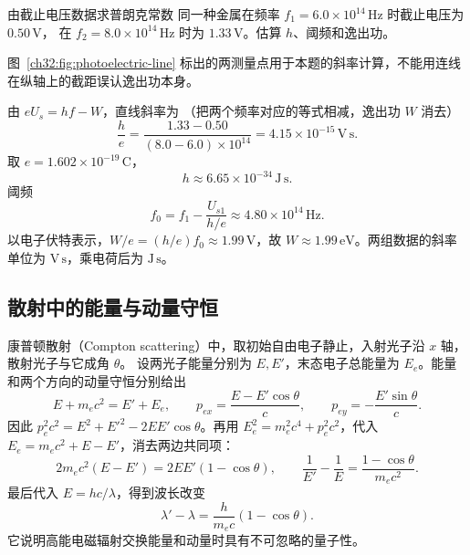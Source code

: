 \begin{origexamplebox}{由截止电压数据求普朗克常数}
同一种金属在频率 $f_1=6.0\times10^{14}\,\mathrm{Hz}$ 时截止电压为 $0.50\,\mathrm V$，
在 $f_2=8.0\times10^{14}\,\mathrm{Hz}$ 时为 $1.33\,\mathrm V$。估算 $h$、阈频和逸出功。
\end{origexamplebox}
\begin{xesolution}

\begin{center}
\label{ch32:fig:photoelectric-line}
\end{center}
图~\ref{ch32:fig:photoelectric-line} 标出的两测量点用于本题的斜率计算，不能用连线在纵轴上的截距误认逸出功本身。


由 $eU_s=hf-W$，直线斜率为
（把两个频率对应的等式相减，逸出功 $W$ 消去）
\[
 \frac he=\frac{1.33-0.50}{(8.0-6.0)\times10^{14}}
 =4.15\times10^{-15}\,\mathrm{V\,s}.
\]
取 $e=1.602\times10^{-19}\,\mathrm C$，
\[
 \boxed{h\approx6.65\times10^{-34}\,\mathrm{J\,s}}.
\]
阈频
\[
 f_0=f_1-\frac{U_{s1}}{h/e}
 \approx\boxed{4.80\times10^{14}\,\mathrm{Hz}}.
\]
以电子伏特表示，$W/e=(h/e)f_0\approx1.99\,\mathrm V$，故
$\boxed{W\approx1.99\,\mathrm{eV}}$。两组数据的斜率单位为 $\mathrm{V\,s}$，乘电荷后为 $\mathrm{J\,s}$。
\end{xesolution}

\subsection{散射中的能量与动量守恒}
康普顿散射（Compton scattering）中，取初始自由电子静止，入射光子沿 $x$ 轴，散射光子与它成角 $\theta$。
设两光子能量分别为 $E,E'$，末态电子总能量为 $E_e$。能量和两个方向的动量守恒分别给出
\[
 E+m_ec^2=E'+E_e,\qquad p_{ex}=\frac{E-E'\cos\theta}{c},\qquad
 p_{ey}=-\frac{E'\sin\theta}{c}.
\]
因此 $p_e^2c^2=E^2+E'^2-2EE'\cos\theta$。再用 $E_e^2=m_e^2c^4+p_e^2c^2$，代入 $E_e=m_ec^2+E-E'$，消去两边共同项：
\[
 2m_ec^2(E-E')=2EE'(1-\cos\theta),\qquad
 \frac1{E'}-\frac1E=\frac{1-\cos\theta}{m_ec^2}.
\]
最后代入 $E=hc/\lambda$，得到波长改变
\begin{equation}
 \lambda'-\lambda=\frac{h}{m_ec}(1-\cos\theta).
\end{equation}
它说明高能电磁辐射交换能量和动量时具有不可忽略的量子性。

